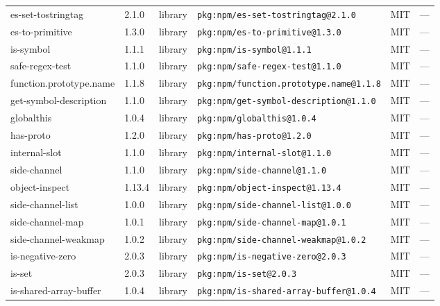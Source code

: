 \documentclass[11pt,a4paper]{article}
\begin{document}
\begin{longtable}{|p{4cm}|p{2cm}|p{1.6cm}|p{5cm}|p{1.5cm}|p{3.5cm}|}
\raggedright es-set-tostringtag & 2.1.0 & library & \small\texttt{pkg:npm/es-set-tostringtag@2.1.0} & MIT & \small — \\
\raggedright es-to-primitive & 1.3.0 & library & \small\texttt{pkg:npm/es-to-primitive@1.3.0} & MIT & \small — \\
\raggedright is-symbol & 1.1.1 & library & \small\texttt{pkg:npm/is-symbol@1.1.1} & MIT & \small — \\
\raggedright safe-regex-test & 1.1.0 & library & \small\texttt{pkg:npm/safe-regex-test@1.1.0} & MIT & \small — \\
\raggedright function.prototype.name & 1.1.8 & library & \small\texttt{pkg:npm/function.prototype.name@1.1.8} & MIT & \small — \\
\raggedright get-symbol-description & 1.1.0 & library & \small\texttt{pkg:npm/get-symbol-description@1.1.0} & MIT & \small — \\
\raggedright globalthis & 1.0.4 & library & \small\texttt{pkg:npm/globalthis@1.0.4} & MIT & \small — \\
\raggedright has-proto & 1.2.0 & library & \small\texttt{pkg:npm/has-proto@1.2.0} & MIT & \small — \\
\raggedright internal-slot & 1.1.0 & library & \small\texttt{pkg:npm/internal-slot@1.1.0} & MIT & \small — \\
\raggedright side-channel & 1.1.0 & library & \small\texttt{pkg:npm/side-channel@1.1.0} & MIT & \small — \\
\raggedright object-inspect & 1.13.4 & library & \small\texttt{pkg:npm/object-inspect@1.13.4} & MIT & \small — \\
\raggedright side-channel-list & 1.0.0 & library & \small\texttt{pkg:npm/side-channel-list@1.0.0} & MIT & \small — \\
\raggedright side-channel-map & 1.0.1 & library & \small\texttt{pkg:npm/side-channel-map@1.0.1} & MIT & \small — \\
\raggedright side-channel-weakmap & 1.0.2 & library & \small\texttt{pkg:npm/side-channel-weakmap@1.0.2} & MIT & \small — \\
\raggedright is-negative-zero & 2.0.3 & library & \small\texttt{pkg:npm/is-negative-zero@2.0.3} & MIT & \small — \\
\raggedright is-set & 2.0.3 & library & \small\texttt{pkg:npm/is-set@2.0.3} & MIT & \small — \\
\raggedright is-shared-array-buffer & 1.0.4 & library & \small\texttt{pkg:npm/is-shared-array-buffer@1.0.4} & MIT & \small — \\

\end{longtable}
\end{document}
